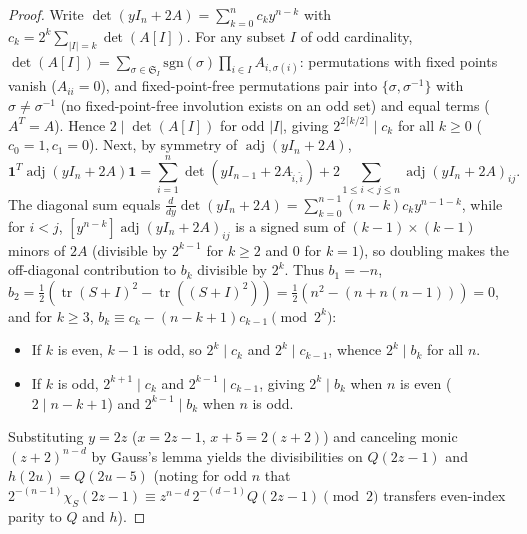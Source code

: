 \documentclass[11pt,reqno]{amsart}
\theoremstyle{definition}
\theoremstyle{remark}
\numberwithin{equation}{section}
\numberwithin{table}{section}
\DeclareMathOperator{\tr}{tr}
\DeclareMathOperator{\adj}{adj}
\begin{document}
\begin{proof}
Write $\det(yI_n + 2A) = \sum_{k=0}^n c_k y^{n - k}$ with $c_k = 2^k \sum_{|I|=k} \det(A[I])$. For any subset $I$ of odd cardinality, $\det(A[I]) = \sum_{\sigma \in \mathfrak{S}_I} \mathrm{sgn}(\sigma) \prod_{i \in I} A_{i,\sigma(i)}$: permutations with fixed points vanish ($A_{ii} = 0$), and fixed-point-free permutations pair into $\{\sigma, \sigma^{-1}\}$ with $\sigma \neq \sigma^{-1}$ (no fixed-point-free involution exists on an odd set) and equal terms ($A^T = A$). Hence $2 \mid \det(A[I])$ for odd $|I|$, giving $2^{2\lceil k/2 \rceil} \mid c_k$ for all $k \ge 0$ ($c_0 = 1, c_1 = 0$). Next, by symmetry of $\adj(yI_n + 2A)$,
\[
  \mathbf{1}^T \adj(yI_n + 2A) \mathbf{1} = \sum_{i=1}^n \det(yI_{n-1} + 2A_{\hat{i},\hat{i}}) + 2 \sum_{1 \le i < j \le n} \adj(yI_n + 2A)_{ij}.
\]
The diagonal sum equals $\frac{d}{dy}\det(yI_n + 2A) = \sum_{k=0}^{n-1} (n - k)c_k y^{n-1-k}$, while for $i < j$, $[y^{n-k}]\adj(yI_n + 2A)_{ij}$ is a signed sum of $(k-1)\times(k-1)$ minors of $2A$ (divisible by $2^{k-1}$ for $k \ge 2$ and $0$ for $k = 1$), so doubling makes the off-diagonal contribution to $b_k$ divisible by $2^k$. Thus $b_1 = -n$, $b_2 = \frac{1}{2}(\tr(S+I)^2 - \tr((S+I)^2)) = \frac{1}{2}(n^2 - (n + n(n-1))) = 0$, and for $k \ge 3$, $b_k \equiv c_k - (n - k + 1)c_{k-1} \pmod{2^k}$:
\begin{itemize}
  \item If $k$ is even, $k - 1$ is odd, so $2^k \mid c_k$ and $2^k \mid c_{k-1}$, whence $2^k \mid b_k$ for all $n$.
  \item If $k$ is odd, $2^{k+1} \mid c_k$ and $2^{k-1} \mid c_{k-1}$, giving $2^k \mid b_k$ when $n$ is even ($2 \mid n - k + 1$) and $2^{k-1} \mid b_k$ when $n$ is odd.
\end{itemize}
Substituting $y = 2z$ ($x = 2z - 1$, $x + 5 = 2(z + 2)$) and canceling monic $(z + 2)^{n - d}$ by Gauss's lemma yields the divisibilities on $Q(2z - 1)$ and $h(2u) = Q(2u - 5)$ (noting for odd $n$ that $2^{-(n-1)}\chi_S(2z-1) \equiv z^{n-d}\,2^{-(d-1)}Q(2z-1) \pmod 2$ transfers even-index parity to $Q$ and $h$).
\end{proof}
\end{document}
